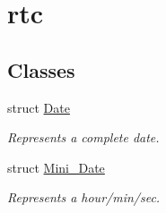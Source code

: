 \hypertarget{group__rtc}{}\section{rtc}
\label{group__rtc}
\subsection*{Classes}
\begin{DoxyCompactItemize}
\item 
struct \mbox{\hyperlink{struct_date}{Date}}
\begin{DoxyCompactList}\small\item\em Represents a complete date. \end{DoxyCompactList}\item 
struct \mbox{\hyperlink{struct_mini___date}{Mini\+\_\+\+Date}}
\begin{DoxyCompactList}\small\item\em Represents a hour/min/sec. \end{DoxyCompactList}\end{DoxyCompactItemize}
